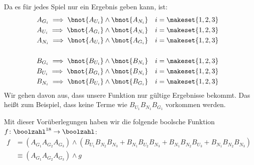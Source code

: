 \begin{enumerate}[label={[OH\arabic*]},start=8]
        Da es für jedes Spiel nur ein Ergebnis geben kann, ist:
        \begin{align*}
            A_{G_i} \implies \bnot{A_{U_i}}\land\bnot{A_{N_i}} && i = \makeset{1,2,3} \\
            A_{U_i} \implies \bnot{A_{G_i}}\land\bnot{A_{N_i}} && i = \makeset{1,2,3} \\
            A_{N_i} \implies \bnot{A_{U_i}}\land\bnot{A_{G_i}} && i = \makeset{1,2,3} \\
            \\
            B_{G_i} \implies \bnot{B_{U_i}}\land\bnot{B_{N_i}} && i = \makeset{1,2,3} \\
            B_{U_i} \implies \bnot{B_{G_i}}\land\bnot{B_{N_i}} && i = \makeset{1,2,3} \\
            B_{N_i} \implies \bnot{B_{U_i}}\land\bnot{B_{G_i}} && i = \makeset{1,2,3}
        \end{align*}
        Wir gehen davon aus, dass unsere Funktion nur gültige Ergebnisse bekommt. Das heißt zum Beispiel, dass keine Terme wie $B_{U_1}B_{N_1}B_{G_1}$ vorkommen werden.

        Mit dieser Vorüberlegungen haben wir die folgende boolsche Funktion $f \colon \boolzahl^{18} \to \boolzahl$:
        {\small
            \begin{align*}
                f &= \left(A_{G_1}A_{G_2}A_{G_3}\right)\land\left(B_{U_1}B_{N_2}B_{N_3} + B_{N_1}B_{U_2}B_{N_3} + B_{N_1}B_{N_2}B_{U_3} + B_{N_1}B_{N_2}B_{N_3} \right) \\ 
                &\equiv \left(A_{G_1}A_{G_2}A_{G_3}\right)\land g 
            \end{align*}
        }


\end{enumerate}
